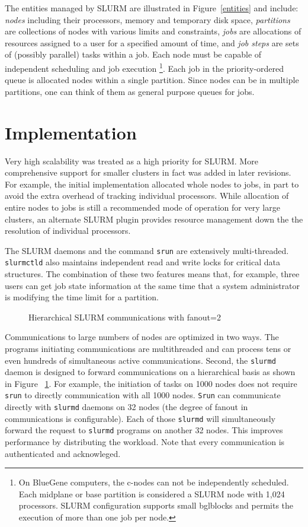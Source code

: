 \documentclass[10pt,onecolumn,times]{../common/llncs}
\begin{document}
{The entities managed by SLURM are illustrated in Figure~\ref{entities} 
and include:
{\em nodes} including their processors, memory and temporary disk space,
{\em partitions} are collections of nodes with various limits and constraints,
{\em jobs} are allocations of resources assigned
to a user for a specified amount of time, and
{\em job steps} are sets of (possibly parallel) tasks within a job.
Each node must be capable of independent scheduling and job execution
\footnote{On BlueGene computers, the c-nodes can not be independently 
scheduled. Each midplane or base partition is considered a SLURM node 
with 1,024 processors. SLURM configuration supports small bglblocks 
and permits the execution of more than one job per node.}.
Each job in the priority-ordered queue is allocated nodes within a single 
partition.
Since nodes can be in multiple partitions, one can think of them as 
general purpose queues for jobs. 

\section{Implementation}

Very high scalability was treated as a high priority for SLURM. 
More comprehensive support for smaller clusters in fact was 
added in later revisions.
For example, the initial implementation allocated whole nodes 
to jobs, in part to avoid the extra overhead of tracking individual
processors.
While allocation of entire nodes to jobs is still a recommended mode of 
operation for very large clusters, an alternate SLURM plugin provides 
resource management down the the resolution of individual processors.

The SLURM daemons and the command {\tt srun} are extensively 
multi-threaded. 
{\tt slurmctld} also maintains independent read and 
write locks for critical data structures. 
The combination of these two features means that, 
for example, three users can get job state information at the same
time that a system administrator is modifying the time limit 
for a partition.

\begin{figure}[tcb]
\centerline{}
\caption{\small Hierarchical SLURM communications with fanout=2}
\label{comms}
\end{figure}

Communications to large numbers of nodes are optimized in two 
ways. The programs initiating communications are multithreaded
and can process tens or even hundreds of simultaneous active 
communications. 
Second, the {\tt slurmd} daemon is designed to forward 
communications on a hierarchical basis as shown in Figure ~\ref{comms}.
For example, the initiation of tasks on 1000 nodes does not require
{\tt srun} to directly communication with all 1000 nodes. {\tt Srun}
can communicate directly with {\tt slurmd} daemons on 32 nodes
(the degree of fanout in communications is configurable). 
Each of those {\tt slurmd} will simultaneously forward the request
to {\tt slurmd} programs on another 32 nodes. 
This improves performance by distributing the workload.
Note that every communication is authenticated and acknowleged.

}
\end{document}
